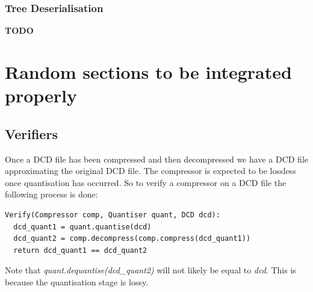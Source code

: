 \documentclass{report}
\newcommand{\todo}{\textbf{TODO} }
\begin{document}
\subsection{Tree Deserialisation}

\todo

\chapter{Random sections to be integrated properly}

\section{Verifiers}

Once a DCD file has been compressed and then decompressed we have a DCD file
approximating the original DCD file. The compressor is expected to be lossless
once quantisation has occurred. So to verify a compressor on a DCD file the
following process is done:

\begin{verbatim}
Verify(Compressor comp, Quantiser quant, DCD dcd):
  dcd_quant1 = quant.quantise(dcd)
  dcd_quant2 = comp.decompress(comp.compress(dcd_quant1))
  return dcd_quant1 == dcd_quant2
\end{verbatim}

Note that \emph{quant.dequantise(dcd\_quant2)} will not likely be equal to
\emph{dcd}. This is because the quantisation stage is lossy.

\nocite{*}

\end{document}
